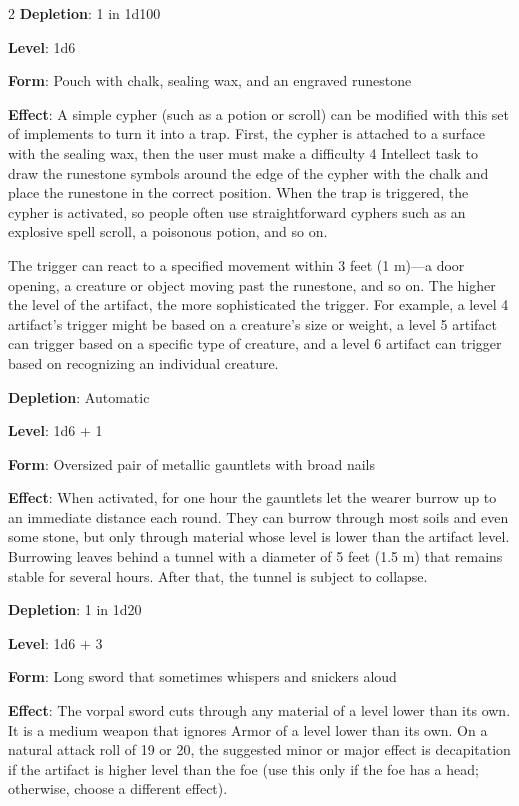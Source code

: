 \begin{multicols}{2}
\textbf{Depletion}: 1 in 1d100


\textbf{Level}: 1d6 

\textbf{Form}: Pouch with chalk, sealing wax, and an engraved runestone 

\textbf{Effect}: A simple cypher (such as a potion or scroll) can be modified with this set of implements to turn it into a trap. First, the cypher is attached to a surface with the sealing wax, then the user must make a difficulty 4 Intellect task to draw the runestone symbols around the edge of the cypher with the chalk and place the runestone in the correct position. When the trap is triggered, the cypher is activated, so people often use straightforward cyphers such as an explosive spell scroll, a poisonous potion, and so on. 

The trigger can react to a specified movement within 3 feet (1 m)—a door opening, a creature or object moving past the runestone, and so on. The higher the level of the artifact, the more sophisticated the trigger. For example, a level 4 artifact’s trigger might be based on a creature’s size or weight, a level 5 artifact can trigger based on a specific type of creature, and a level 6 artifact can trigger based on recognizing an individual creature. 

\textbf{Depletion}: Automatic 


\textbf{Level}: 1d6 + 1 

\textbf{Form}: Oversized pair of metallic gauntlets with broad nails 

\textbf{Effect}: When activated, for one hour the gauntlets let the wearer burrow up to an immediate distance each round. They can burrow through most soils and even some stone, but only through material whose level is lower than the artifact level. Burrowing leaves behind a tunnel with a diameter of 5 feet (1.5 m) that remains stable for several hours. After that, the tunnel is subject to collapse. 

\textbf{Depletion}: 1 in 1d20


\textbf{Level}: 1d6 + 3 

\textbf{Form}: Long sword that sometimes whispers and snickers aloud 

\textbf{Effect}: The vorpal sword cuts through any material of a level lower than its own. It is a medium weapon that ignores Armor of a level lower than its own. On a natural attack roll of 19 or 20, the suggested minor or major effect is decapitation if the artifact is higher level than the foe (use this only if the foe has a head; otherwise, choose a different effect). 


\end{multicols}
